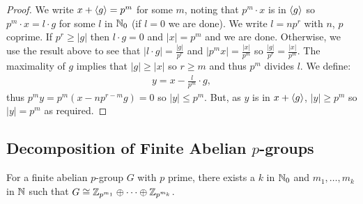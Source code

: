 \begin{proof}
    We write $x + {\langle g \rangle} = p^m$ for some $m$, noting that $p^m \cdot x$ 
    is in ${\langle g \rangle}$ so $p^m \cdot x = l \cdot g$ for some $l$ in $\mathbb{N}_0$ 
    (if $l = 0$ we are done). We write $l = np^r$ with $n$, $p$ coprime.
    If $p^r \geq |g|$ then $l \cdot g = 0$ and $|x| = p^m$ and we are done.
    Otherwise, we use the result above to see that 
    $|l \cdot g| = \frac{|g|}{p^r}$ and $|p^mx| = \frac{|x|}{p^m}$
    so $\frac{|g|}{p^r} = \frac{|x|}{p^m}$. The maximality of $g$ 
    implies that $|g| \geq |x|$ so $r \geq m$ and thus $p^m$ divides $l$.
    We define: \begin{align*}
        y = x - \frac{l}{p^m} \cdot g,
    \end{align*} thus $p^my=p^m(x - np^{r-m}g) = 0$ so $|y| \leq p^m$.
    But, as $y$ is in $x + {\langle g \rangle}$, $|y| \geq p^m$ so $|y| = p^m$ as
    required.
\end{proof}

\subsection{Decomposition of Finite Abelian $p$-groups}

For a finite abelian $p$-group $G$ with $p$ prime, there exists a $k$
in $\mathbb{N}_0$ and $m_1, \ldots, m_k$ in $\mathbb{N}$ such that 
$G \cong \mathbb{Z}_{p^{m_1}} \oplus \cdots \oplus \mathbb{Z}_{p^{m_k}}$.

